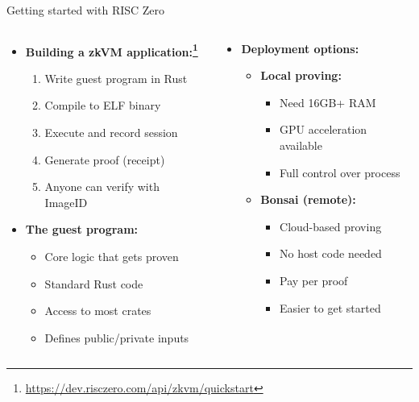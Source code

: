 \documentclass[aspectratio=169, lualatex, handout]{beamer}
\begin{document}
\begin{frame}{Getting started with RISC Zero}
	\begin{columns}[c]
		\begin{column}{0.5\textwidth}
			\begin{itemize}
				\item \textbf{Building a zkVM application:\footnote{\url{https://dev.risczero.com/api/zkvm/quickstart}}}
				      \begin{enumerate}
					      \item Write guest program in Rust
					      \item Compile to ELF binary
					      \item Execute and record session
					      \item Generate proof (receipt)
					      \item Anyone can verify with ImageID
				      \end{enumerate}
				\item \textbf{The guest program:}
				      \begin{itemize}
					      \item Core logic that gets proven
					      \item Standard Rust code
					      \item Access to most crates
					      \item Defines public/private inputs
				      \end{itemize}
			\end{itemize}
		\end{column}
		\begin{column}{0.5\textwidth}
			\begin{itemize}
				\item \textbf{Deployment options:}
				      \begin{itemize}
					      \item \textbf{Local proving:}
					            \begin{itemize}
						            \item Need 16GB+ RAM
						            \item GPU acceleration available
						            \item Full control over process
					            \end{itemize}
					      \item \textbf{Bonsai (remote):}
					            \begin{itemize}
						            \item Cloud-based proving
						            \item No host code needed
						            \item Pay per proof
						            \item Easier to get started
					            \end{itemize}
				      \end{itemize}
			\end{itemize}
		\end{column}
	\end{columns}
\end{frame}
\end{document}
